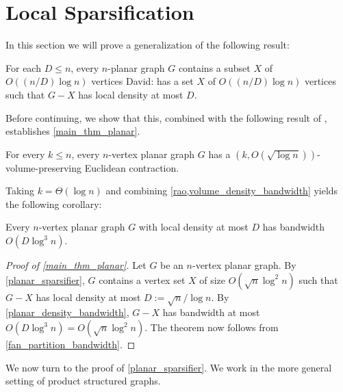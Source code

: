 \documentclass{patmorin}
\renewcommand{\le}{\leqslant}
\newcommand{\david}[1]{{\color{orange} David: #1}}
\begin{document}
\section{Local Sparsification}
\label{local_sparsification_section}

In this section we will prove a generalization of the following result:

\begin{lem}\label{planar_sparsifier}
  For each $D\le n$, every $n$-planar graph $G$ contains a subset $X$ of $O((n/D)\log n)$ vertices  \david{has a set $X$ of $O((n/D)\log n)$ vertices}   such that $G-X$ has local density at most $D$.
\end{lem}

Before continuing, we show that this, combined with the following result of \citet{rao:small}, establishes \cref{main_thm_planar}.

\begin{thm}\label{rao}
  For every $k\le n$, every $n$-vertex planar graph $G$ has a $(k,O(\sqrt{\log n}))$-volume-preserving Euclidean contraction.
\end{thm}

Taking $k=\Theta(\log n)$ and combining \cref{rao,volume_density_bandwidth} yields the following corollary:

\begin{cor}\label{planar_density_bandwidth}
  Every $n$-vertex planar graph $G$ with local density at most $D$ has bandwidth $O(D\log^{3} n)$.
\end{cor}


\begin{proof}[Proof of \cref{main_thm_planar}]
  Let $G$ be an $n$-vertex planar graph.  By \cref{planar_sparsifier}, $G$ contains a vertex set $X$ of size $O(\sqrt{n}\log^2 n)$ such that $G-X$ has local density at most $D:=\sqrt{n}/\log n$.  By \cref{planar_density_bandwidth}, $G-X$ has bandwidth at most $O(D\log^{3} n)=O(\sqrt{n}\log^2 n)$.  The theorem now follows from \cref{fan_partition_bandwidth}.
\end{proof}

We now turn to the proof of \cref{planar_sparsifier}.  We work in the more general setting of product structured graphs.
\end{document}
